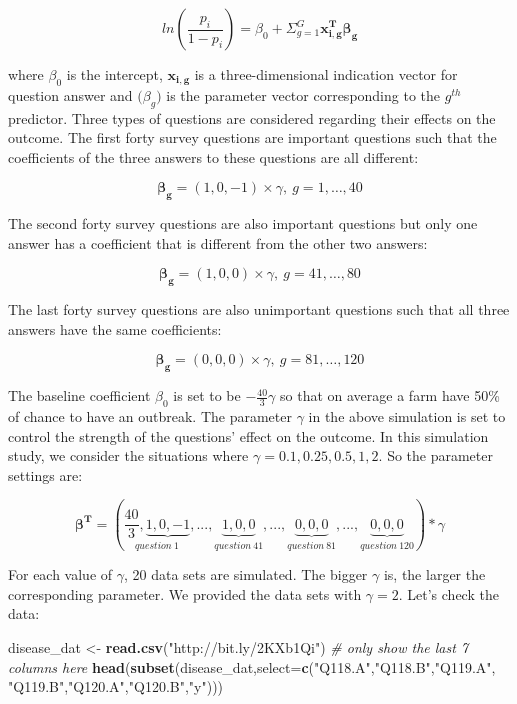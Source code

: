 \documentclass[12pt,]{krantz}
\makeatletter
\newenvironment{Shaded}{\begin{snugshade}}{\end{snugshade}}
\newcommand{\CommentTok}[1]{\textcolor[rgb]{0.37,0.37,0.37}{\textit{#1}}}
\newcommand{\DataTypeTok}[1]{\textcolor[rgb]{0.27,0.27,0.27}{#1}}
\newcommand{\KeywordTok}[1]{\textcolor[rgb]{0.27,0.27,0.27}{\textbf{#1}}}
\newcommand{\NormalTok}[1]{#1}
\newcommand{\StringTok}[1]{\textcolor[rgb]{0.5,0.5,0.5}{#1}}
\newenvironment{kframe}{%
\medskip{}
\setlength{\fboxsep}{.8em}
 \def\at@end@of@kframe{}%
 \ifinner\ifhmode%
  \def\at@end@of@kframe{\end{minipage}}%
  \begin{minipage}{\columnwidth}%
 \fi\fi%
 \def\FrameCommand##1{\hskip\@totalleftmargin \hskip-\fboxsep
 \colorbox{shadecolor}{##1}\hskip-\fboxsep
     \hskip-\linewidth \hskip-\@totalleftmargin \hskip\columnwidth}%
 \MakeFramed {\advance\hsize-\width
   \@totalleftmargin\z@ \linewidth\hsize
   \@setminipage}}%
 {\par\unskip\endMakeFramed%
 \at@end@of@kframe}
\renewenvironment{Shaded}{\begin{kframe}}{\end{kframe}}
\makeatother
\begin{document}
\[ln(\frac{p_i}{1-p_i})=\beta_0 + \Sigma_{g=1}^G\mathbf{x_{i,g}^T\beta_{g}}\]

where \(\beta_0\) is the intercept, \(\mathbf{x_{i,g}}\) is a three-dimensional indication vector for question answer and \(\mathbf(\beta_g)\) is the parameter vector corresponding to the \(g^{th}\) predictor. Three types of questions are considered regarding their effects on the outcome. The first forty survey questions are important questions such that the coefficients of the three answers to these
questions are all different:

\[\mathbf{\beta_g}=(1,0,-1)\times \gamma,\ g=1,\dots,40\]

The second forty survey questions are also important questions but only one answer has a coefficient that is different from the other two answers:

\[\mathbf{\beta_g}=(1,0,0)\times \gamma,\ g=41,\dots,80\]

The last forty survey questions are also unimportant questions such that all three answers have the same coefficients:

\[\mathbf{\beta_g}=(0,0,0)\times \gamma,\ g=81,\dots,120\]

The baseline coefficient \(\beta_0\) is set to be \(-\frac{40}{3}\gamma\) so that on average a farm have 50\% of chance to have an outbreak. The parameter \(\gamma\) in the above simulation is set to control the strength of the questions' effect on the outcome. In this simulation study, we consider the situations where \(\gamma = 0.1, 0.25, 0.5, 1, 2\). So the parameter settings are:

\[\mathbf{\beta^{T}} = \left(\underset{question\ 1}{\frac{40}{3},\underbrace{1,0,-1}},...,\underset{question\ 41}{\underbrace{1,0,0}},...,\underset{question\ 81}{\underbrace{0,0,0}},...,\underset{question\ 120}{\underbrace{0,0,0}}\right)*\gamma\]

For each value of \(\gamma\), 20 data sets are simulated. The bigger \(\gamma\) is, the larger the corresponding parameter. We provided the data sets with \(\gamma = 2\). Let's check the data:

\begin{Shaded}
\begin{Highlighting}[]
\NormalTok{disease_dat <-}\StringTok{ }\KeywordTok{read.csv}\NormalTok{(}\StringTok{"http://bit.ly/2KXb1Qi"}\NormalTok{)}
\CommentTok{# only show the last 7 columns here}
\KeywordTok{head}\NormalTok{(}\KeywordTok{subset}\NormalTok{(disease_dat,}\DataTypeTok{select=}\KeywordTok{c}\NormalTok{(}\StringTok{"Q118.A"}\NormalTok{,}\StringTok{"Q118.B"}\NormalTok{,}\StringTok{"Q119.A"}\NormalTok{,}
                                 \StringTok{"Q119.B"}\NormalTok{,}\StringTok{"Q120.A"}\NormalTok{,}\StringTok{"Q120.B"}\NormalTok{,}\StringTok{"y"}\NormalTok{))) }
\end{Highlighting}
\end{Shaded}
\end{document}
